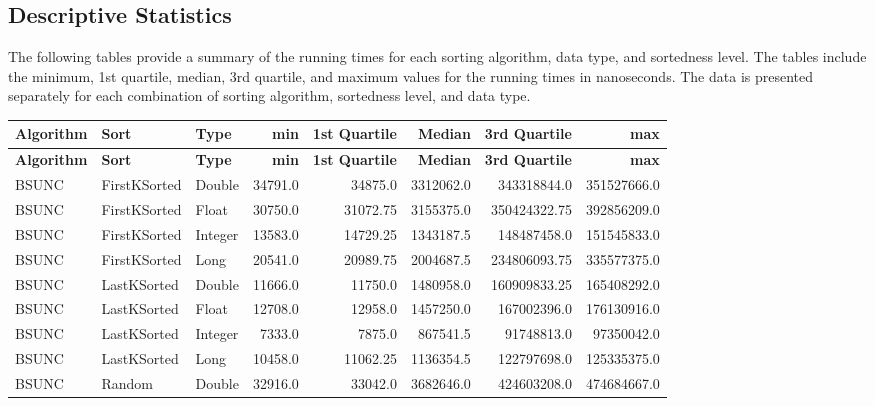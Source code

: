 \documentclass[unicode,11pt,a4paper,oneside,numbers=endperiod,openany]{scrartcl}
\begin{document}
    \subsection{Descriptive Statistics}

    The following tables provide a summary of the running times for each sorting algorithm, data type, and sortedness level. The tables include the minimum, 1st quartile, median, 3rd quartile, and maximum values for the running times in nanoseconds. The data is presented separately for each combination of sorting algorithm, sortedness level, and data type.\\

    \begin{center}
        \begin{longtable}{|l|l|l|r|r|r|r|r|}
            \hline
            \textbf{Algorithm} & \textbf{Sort} & \textbf{Type} & \textbf{min} & \textbf{1st Quartile} & \textbf{Median} & \textbf{3rd Quartile} & \textbf{max} \\
            \hline
            \endfirsthead
            \hline
            \textbf{Algorithm} & \textbf{Sort} & \textbf{Type} & \textbf{min} & \textbf{1st Quartile} & \textbf{Median} & \textbf{3rd Quartile} & \textbf{max} \\
            \hline
            \endhead
            \hline
            \endfoot
            BSUNC & FirstKSorted & Double & 34791.0 & 34875.0 & 3312062.0 & 343318844.0 & 351527666.0 \\
            BSUNC & FirstKSorted & Float & 30750.0 & 31072.75 & 3155375.0 & 350424322.75 & 392856209.0 \\
            BSUNC & FirstKSorted & Integer & 13583.0 & 14729.25 & 1343187.5 & 148487458.0 & 151545833.0 \\
            BSUNC & FirstKSorted & Long & 20541.0 & 20989.75 & 2004687.5 & 234806093.75 & 335577375.0 \\
            BSUNC & LastKSorted & Double & 11666.0 & 11750.0 & 1480958.0 & 160909833.25 & 165408292.0 \\
            BSUNC & LastKSorted & Float & 12708.0 & 12958.0 & 1457250.0 & 167002396.0 & 176130916.0 \\
            BSUNC & LastKSorted & Integer & 7333.0 & 7875.0 & 867541.5 & 91748813.0 & 97350042.0 \\
            BSUNC & LastKSorted & Long & 10458.0 & 11062.25 & 1136354.5 & 122797698.0 & 125335375.0 \\
            BSUNC & Random & Double & 32916.0 & 33042.0 & 3682646.0 & 424603208.0 & 474684667.0 \\

\end{longtable}
\end{center}
\end{document}
